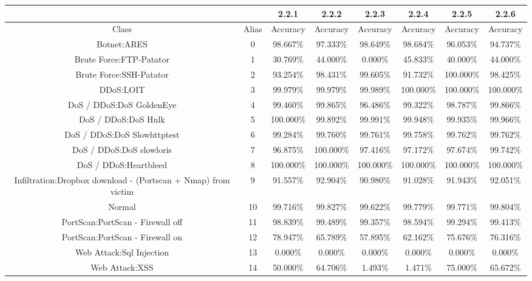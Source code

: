 \begin{table}[htb]
    \centering
    \begin{tabular}{@{}cccccccc@{}}
        \toprule
         &  & 2.2.1 & 2.2.2 & 2.2.3 & 2.2.4 & 2.2.5 & 2.2.6 \\
        \midrule
        Class &  Alias &  Accuracy &  Accuracy &  Accuracy &  Accuracy &  Accuracy &  Accuracy \\
        Botnet:ARES &  0 &  98.667\% &  97.333\% &  98.649\% &  98.684\% &  96.053\% &  94.737\% \\
        Brute Force:FTP-Patator &  1 &  30.769\% &  44.000\% &  0.000\% &  45.833\% &  40.000\% &  44.000\% \\
        Brute Force:SSH-Patator &  2 &  93.254\% &  98.431\% &  99.605\% &  91.732\% &  100.000\% &  98.425\% \\
        DDoS:LOIT &  3 &  99.979\% &  99.979\% &  99.989\% &  100.000\% &  100.000\% &  100.000\% \\
        DoS / DDoS:DoS GoldenEye &  4 &  99.460\% &  99.865\% &  96.486\% &  99.322\% &  98.787\% &  99.866\% \\
        DoS / DDoS:DoS Hulk &  5 &  100.000\% &  99.892\% &  99.991\% &  99.948\% &  99.935\% &  99.966\% \\
        DoS / DDoS:DoS Slowhttptest &  6 &  99.284\% &  99.760\% &  99.761\% &  99.758\% &  99.762\% &  99.762\% \\
        DoS / DDoS:DoS slowloris &  7 &  96.875\% &  100.000\% &  97.416\% &  97.172\% &  97.674\% &  99.742\% \\
        DoS / DDoS:Heartbleed &  8 &  100.000\% &  100.000\% &  100.000\% &  100.000\% &  100.000\% &  100.000\% \\
        Infiltration:Dropbox download - (Portscan + Nmap) from victim &  9 &  91.557\% &  92.904\% &  90.980\% &  91.028\% &  91.943\% &  92.051\% \\
        Normal &  10 &  99.716\% &  99.827\% &  99.622\% &  99.779\% &  99.771\% &  99.804\% \\
        PortScan:PortScan - Firewall off &  11 &  98.839\% &  99.489\% &  99.357\% &  98.594\% &  99.294\% &  99.413\% \\
        PortScan:PortScan - Firewall on &  12 &  78.947\% &  65.789\% &  57.895\% &  62.162\% &  75.676\% &  76.316\% \\
        Web Attack:Sql Injection &  13 &  0.000\% &  0.000\% &  0.000\% &  0.000\% &  0.000\% &  0.000\% \\
        Web Attack:XSS &  14 &  50.000\% &  64.706\% &  1.493\% &  1.471\% &  75.000\% &  65.672\% \\

\end{tabular}
\end{table}
